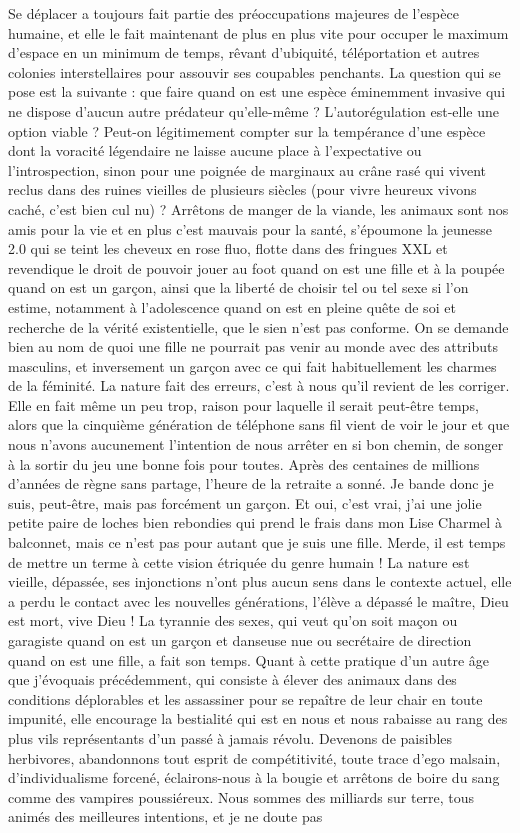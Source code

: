 \label{rat:46}%
Se déplacer a toujours fait partie des préoccupations majeures de l’espèce humaine, et elle le fait maintenant de plus en plus vite pour occuper le maximum d’espace en un minimum de temps, rêvant d’ubiquité, téléportation et autres colonies interstellaires pour assouvir ses coupables penchants. La question qui se pose est la suivante : que faire quand on est une espèce éminemment invasive qui ne dispose d’aucun autre prédateur qu’elle-même ? L’autorégulation est-elle une option viable ? Peut-on légitimement compter sur la tempérance d’une espèce dont la voracité légendaire ne laisse aucune place à l’expectative ou l’introspection, sinon pour une poignée de marginaux au crâne rasé qui vivent reclus dans des ruines vieilles de plusieurs siècles (pour vivre heureux vivons caché, c’est bien cul nu) ? Arrêtons de manger de la viande, les animaux sont nos amis pour la vie et en plus c’est mauvais pour la santé, s’époumone la jeunesse 2.0 qui se teint les cheveux en rose fluo, flotte dans des fringues XXL et revendique le droit de pouvoir jouer au foot quand on est une fille et à la poupée quand on est un garçon, ainsi que la liberté de choisir tel ou tel sexe si l’on estime, notamment à l’adolescence quand on est en pleine quête de soi et recherche de la vérité existentielle, que le sien n’est pas conforme. On se demande bien au nom de quoi une fille ne pourrait pas venir au monde avec des attributs masculins, et inversement un garçon avec ce qui fait habituellement les charmes de la féminité. La nature fait des erreurs, c’est à nous qu’il revient de les corriger. Elle en fait même un peu trop, raison pour laquelle il serait peut-être temps, alors que la cinquième génération de téléphone sans fil vient de voir le jour et que nous n’avons aucunement l’intention de nous arrêter en si bon chemin, de songer à la sortir du jeu une bonne fois pour toutes. Après des centaines de millions d’années de règne sans partage, l’heure de la retraite a sonné. Je bande donc je suis, peut-être, mais pas forcément un garçon. Et oui, c’est vrai, j’ai une jolie petite paire de loches bien rebondies qui prend le frais dans mon Lise Charmel à balconnet, mais ce n’est pas pour autant que je suis une fille. Merde, il est temps de mettre un terme à cette vision étriquée du genre humain ! La nature est vieille, dépassée, ses injonctions n’ont plus aucun sens dans le contexte actuel, elle a perdu le contact avec les nouvelles générations, l’élève a dépassé le maître, Dieu est mort, vive Dieu ! La tyrannie des sexes, qui veut qu’on soit maçon ou garagiste quand on est un garçon et danseuse nue ou secrétaire de direction quand on est une fille, a fait son temps. Quant à cette pratique d’un autre âge que j’évoquais précédemment, qui consiste à élever des animaux dans des conditions déplorables et les assassiner pour se repaître de leur chair en toute impunité, elle encourage la bestialité qui est en nous et nous rabaisse au rang des plus vils représentants d’un passé à jamais révolu. Devenons de paisibles herbivores, abandonnons tout esprit de compétitivité, toute trace d’ego malsain, d’individualisme forcené, éclairons-nous à la bougie et arrêtons de boire du sang comme des vampires poussiéreux. Nous sommes des milliards sur terre, tous animés des meilleures intentions, et je ne doute pas 